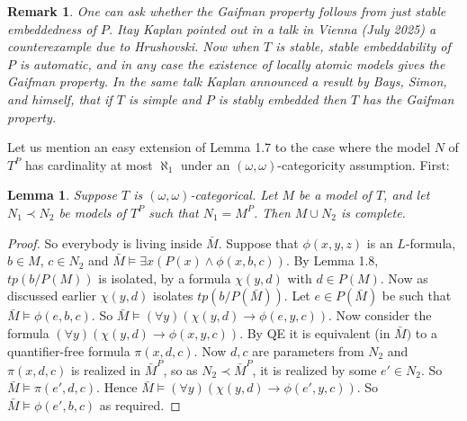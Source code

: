 \documentclass[12pt]{article}
\newtheorem{Remark}[Theorem]{Remark}
\newtheorem{Lemma}[Theorem]{Lemma}
\begin{document}
\begin{Remark} One can ask whether the Gaifman property follows from just stable embeddedness of $P$.   Itay Kaplan pointed out in a talk in Vienna (July 2025) a counterexample due to Hrushovski. 
Now when $T$ is stable, stable embeddability of $P$ is automatic, and in any case the existence of locally atomic models gives the Gaifman property.
In the same talk Kaplan  announced a result by  Bays, Simon, and himself, that if $T$ is  simple and $P$ is stably embedded then $T$ has the Gaifman property. 
\end{Remark}  

Let us mention an easy extension of Lemma 1.7 to the case where the model $N$ of $T^{P}$ has cardinality at most $\aleph_{1}$ under an $(\omega, \omega)$-categoricity assumption. First: 



\begin{Lemma}  Suppose $T$ is  $(\omega, \omega)$-categorical. Let $M$ be a model of $T$, and let $N_{1}\prec N_{2}$ be models of $T^{P}$ such that $N_{1} = M^{P}$.
 Then $M\cup N_{2}$ is complete.
\end{Lemma}
\begin{proof} So everybody is living inside ${\bar M}$.  Suppose that $\phi(x,y,z)$ is an $L$-formula, $b\in M$, $c\in N_{2}$ and  ${\bar M}\models \exists x(P(x)\wedge \phi(x,b,c))$. 
By Lemma 1.8,  $tp(b/P(M))$ is isolated, by a formula $\chi(y,d)$ with $d\in P(M)$.  Now as discussed earlier $\chi(y,d)$ isolates $tp(b/P({\bar M}))$.
Let $e\in P({\bar M})$ be such that  ${\bar M}\models \phi(e,b,c)$. So  $ {\bar M}
\models (\forall y)(\chi(y,d) \to \phi(e,y, c))$.   Now consider the formula $(\forall y)(\chi(y,d)  \to \phi(x,y,c))$. By QE it is equivalent (in ${\bar M})$ to a quantifier-free formula 
$\pi(x,d,c)$. Now $d,c$ are parameters from $N_{2}$ and $\pi(x,d,c)$ is realized in ${\bar M}^{P}$, so as $N_{2}\prec {\bar M}^{P}$, it is realized by some $e'\in N_{2}$. 
So ${\bar M}\models \pi(e',d,c)$.  Hence ${\bar M}\models (\forall y)(\chi(y,d) \to \phi(e',y,c))$. So  ${\bar M}\models \phi(e',b,c)$ as required. 
\end{proof}
\end{document}
